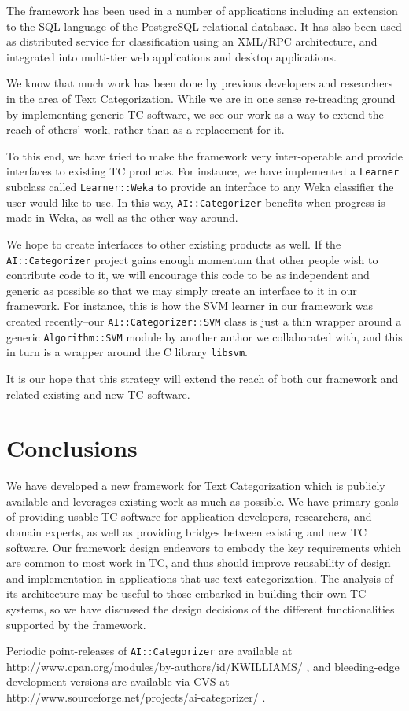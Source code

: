 \documentclass[a4paper,twocolumn]{article}
\begin{document}
The framework has been used in a number of applications including an
extension to the SQL language of the PostgreSQL relational
database. It has also been used as distributed service for
classification using an XML/RPC architecture, and integrated into
multi-tier web applications and desktop applications.

We know that much work has been done by previous developers and
researchers in the area of Text Categorization.  While we are in one
sense re-treading ground by implementing generic TC software, we see
our work as a way to extend the reach of others' work, rather than as
a replacement for it.

To this end, we have tried to make the framework very inter-operable
and provide interfaces to existing TC products.  For instance, we have
implemented a \texttt{Learner} subclass called \texttt{Learner::Weka}
to provide an interface to any Weka classifier the user would like to
use.  In this way, \texttt{AI::Categorizer} benefits when progress is
made in Weka, as well as the other way around.

We hope to create interfaces to other existing products as well.  If the
\texttt{AI::Categorizer} project gains enough momentum that other
people wish to contribute code to it, we will encourage this code to
be as independent and generic as possible so that we may simply
create an interface to it in our framework.  For instance, this is 
how the SVM learner in our framework was created recently--our
\texttt{AI::Categorizer::SVM} class is just a thin wrapper around a
generic \texttt{Algorithm::SVM} module by another author we
collaborated with, and this in turn is a wrapper around the C library
\texttt{libsvm}.

It is our hope that this strategy will extend the reach of both our
framework and related existing and new TC software.


\section{Conclusions}

We have developed a new framework for Text Categorization which is
publicly available and leverages existing work as much as possible.
We have primary goals of providing usable TC software for application
developers, researchers, and domain experts, as well as providing
bridges between existing and new TC software.  Our framework design
endeavors to embody the key requirements which are common to most work
in TC, and thus should improve reusability of design and
implementation in applications that use text categorization.  The
analysis of its architecture may be useful to those embarked in building
their own TC systems, so we have discussed the design decisions of the
different functionalities supported by the framework.

Periodic point-releases of \texttt{AI::Categorizer} are available at
http://www.cpan.org/modules/by-authors/id/KWILLIAMS/ , and
bleeding-edge development versions are available via CVS at
http://www.sourceforge.net/projects/ai-categorizer/ .




\end{document}
